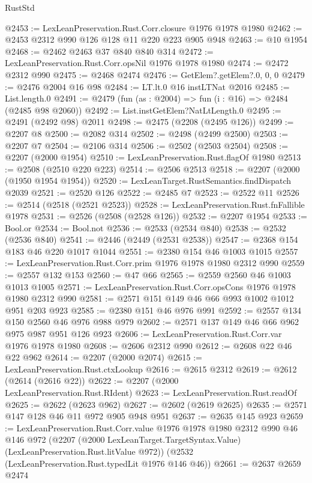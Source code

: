 \begin{lexlean}{RustStd}
\begin{coremodule}
@2453 := LexLeanPreservation.Rust.Corr.closure @1976 @1978 @1980
@2462 := @2453 @2312 @990 @126 @128 @11 @220 @223 @905 @948
@2463 := @10 @1954
@2468 := @2462 @2463 @37 @840 @840 @314
@2472 := LexLeanPreservation.Rust.Corr.opsNil @1976 @1978 @1980
@2474 := @2472 @2312 @990
@2475 := @2468 @2474
@2476 := GetElem?.getElem?.{0, 0, 0}
@2479 := @2476 @2004 @16 @98
@2484 := LT.lt.{0} @16 instLTNat @2016
@2485 := List.length.{0}
@2491 := @2479 (fun (as : @2004) => fun (i : @16) => @2484 (@2485 @98 @2060))
@2492 := List.instGetElem?NatLtLength.{0}
@2495 := @2491 (@2492 @98) @2011
@2498 := @2475 (@2208 (@2495 @126))
@2499 := @2207 @8
@2500 := @2082 @314
@2502 := @2498 (@2499 @2500)
@2503 := @2207 @7
@2504 := @2106 @314
@2506 := @2502 (@2503 @2504)
@2508 := @2207 (@2000 @1954)
@2510 := LexLeanPreservation.Rust.flagOf @1980
@2513 := @2508 (@2510 @220 @223)
@2514 := @2506 @2513
@2518 := @2207 (@2000 (@1950 @1954 @1954))
@2520 := LexLeanTarget.RustSemantics.findDispatch @2039
@2521 := @2520 @126
@2522 := @2485 @7
@2523 := @2522 @11
@2526 := @2514 (@2518 (@2521 @2523))
@2528 := LexLeanPreservation.Rust.fnFallible @1978
@2531 := @2526 (@2508 (@2528 @126))
@2532 := @2207 @1954
@2533 := Bool.or
@2534 := Bool.not
@2536 := @2533 (@2534 @840)
@2538 := @2532 (@2536 @840)
@2541 := @2446 (@2449 (@2531 @2538))
@2547 := @2368 @154 @183 @46 @220 @1017 @1044
@2551 := @2380 @154 @46 @1003 @1015
@2557 := LexLeanPreservation.Rust.Corr.prim @1976 @1978 @1980 @2312 @990
@2559 := @2557 @132 @153
@2560 := @47 @66
@2565 := @2559 @2560 @46 @1003 @1013 @1005
@2571 := LexLeanPreservation.Rust.Corr.opsCons @1976 @1978 @1980 @2312 @990
@2581 := @2571 @151 @149 @46 @66 @993 @1002 @1012 @951 @203 @923
@2585 := @2380 @151 @46 @976 @991
@2592 := @2557 @134 @150 @2560 @46 @976 @988 @979
@2602 := @2571 @137 @149 @46 @66 @962 @975 @987 @951 @126 @923
@2606 := LexLeanPreservation.Rust.Corr.var @1976 @1978 @1980
@2608 := @2606 @2312 @990
@2612 := @2608 @22 @46 @22 @962
@2614 := @2207 (@2000 @2074)
@2615 := LexLeanPreservation.Rust.ctxLookup
@2616 := @2615 @2312
@2619 := @2612 (@2614 (@2616 @22))
@2622 := @2207 (@2000 LexLeanPreservation.Rust.RIdent)
@2623 := LexLeanPreservation.Rust.readOf
@2625 := @2622 (@2623 @962)
@2627 := @2602 (@2619 @2625)
@2635 := @2571 @147 @128 @46 @11 @972 @905 @948 @951
@2637 := @2635 @145 @923
@2659 := LexLeanPreservation.Rust.Corr.value
    @1976
    @1978
    @1980
    @2312
    @990
    @46
    @146
    @972
    (@2207 (@2000 LexLeanTarget.TargetSyntax.Value) (LexLeanPreservation.Rust.litValue @972))
    (@2532 (LexLeanPreservation.Rust.typedLit @1976 @146 @46))
@2661 := @2637 @2659 @2474

\end{coremodule}
\end{lexlean}
